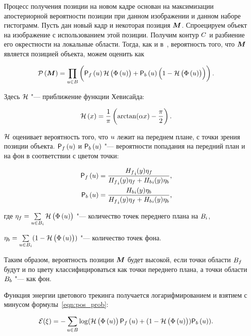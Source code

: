 Процесс получения позиции на новом кадре основан на максимизации апостериорной
вероятности позиции при данном изображении и данном наборе гистограмм.
Пусть дан новый кадр и некоторая позиция $\bm{M}$.
Спроецируем объект на изображение с использованием этой позиции.
Получим контур $C$ и разбиение его окрестности на локальные области.
Тогда, как и в~\cite{Hexner2016}, вероятность того, что $\bm{M}$ является
позицией
объекта, можем оценить как

\begin{equation}
\label{eqn:pos_prob}
    \mathcal{P} \left( \bm{M} \right)  = \prod\limits_{\mathnormal{u} \in B} \left(
        \mathsf{P}_f \left( \mathnormal{u} \right) \mathcal{H} \left( \Phi \left( \mathnormal{u} \right) \right)
        + \mathsf{P}_b \left( \mathnormal{u} \right) \left( 1 - \mathcal{H} \left( \Phi \left( \mathnormal{u} \right) \right) \right)
    \right)
\text{.}
\end{equation}

Здесь $\mathcal{H}$ "--- приближение функции Хевисайда:

\begin{equation}
\label{eqn:heaviside}
    \mathcal{H} \left( x \right) = \frac{1}{\pi} \left( \arctan(\alpha x) - \frac{\pi}{2} \right)
\text{.}
\end{equation}

$\mathcal{H}$ оценивает вероятность того, что $\mathnormal{u}$ лежит на переднем плане, с точки
зрения позиции объекта.
$\mathsf{P}_f \left( \mathnormal{u} \right)$ и $\mathsf{P}_b \left( \mathnormal{u} \right)$ "--- вероятности попадания на передний план и
на фон в соответствии с цветом точки:

\begin{align}
\label{eqn:Pfu}
    \mathsf{P}_f \left( \mathnormal{u} \right) &= \frac{{H_f}_i(y)\eta_f}{{H_f}_i(y)\eta_f +
        {H_b}_i(y)\eta_b} \text{,} \\
    \mathsf{P}_b \left( \mathnormal{u} \right) &=\frac{{H_b}_i(y)\eta_b}{{H_f}_i(y)\eta_f +
        {H_b}_i(y)\eta_b} \text{,}
\end{align}

где
$
    \eta_f = \sum\limits_{\mathnormal{u} \in B_i}\mathcal{H} \left( \Phi \left( \mathnormal{u} \right) \right)
$ "--- количество точек переднего плана на $B_i$,

$
    \eta_b = \sum\limits_{\mathnormal{u} \in B_i}(1 - \mathcal{H} \left( \Phi \left( \mathnormal{u} \right) \right))
$ "--- количество точек фона.


Таким образом, вероятность позиции $\bm{M}$ будет высокой, если точки области
$B_f$ будут и по цвету классифицироваться как точки переднего плана, а
точки области $B_b$ "--- как фон.

Функция энергии цветового трекинга получается логарифмированием и взятием с
минусом
формулы~\ref{eqn:pos_prob}:

\begin{equation}
\label{eqn:err_func}
\mathcal{E}(\xi) = - \sum\limits_{\mathnormal{u} \in B}
\log(\mathcal{H} \left( \Phi \left( \mathnormal{u} \right) \right) \mathsf{P}_f \left( \mathnormal{u} \right) + (1 - \mathcal{H} \left( \Phi \left( \mathnormal{u} \right) \right))\mathsf{P}_b \left( \mathnormal{u} \right))
\text{.}
\end{equation}

